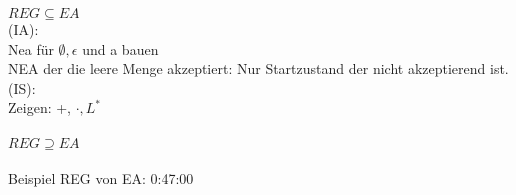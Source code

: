 \documentclass{article}
\begin{document}
$REG \subseteq EA$ \\
(IA): \\ 
Nea für $\emptyset, \epsilon$ und a bauen \\
NEA der die leere Menge akzeptiert: Nur Startzustand der nicht 
akzeptierend ist.
\\
(IS): \\
Zeigen: +, $\cdot, L^*$ \\
\\
$REG \supseteq EA$ \\
\\
Beispiel REG von EA: 0:47:00
\end{document}
